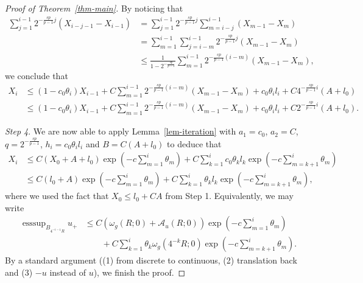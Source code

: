 \documentclass[11pt]{amsart}
\theoremstyle{plain}
\theoremstyle{definition}
\numberwithin{equation}{section}
\DeclareMathOperator*{\esssup}{esssup}
\begin{document}
\begin{proof}[Proof of Theorem~\ref{thm-main}]
    By noticing that
    \begin{equation*}
        \begin{aligned}
            \sum_{j=1}^{i-1}2^{-\frac{sp}{p-1}j}(X_{i-j-1}-X_{i-1})&=\sum_{j=1}^{i-1}2^{-\frac{sp}{p-1}j}\sum^{i-1}_{m=i-j}(X_{m-1}-X_{m})\\
            &=\sum_{m=1}^{i-1}\sum^{i-1}_{j=i-m}2^{-\frac{sp}{p-1}j}(X_{m-1}-X_{m})\\
            &\leq \frac{1}{1-2^{-\frac{sp}{p-1}}}\sum_{m=1}^{i-1}2^{-\frac{sp}{p-1}(i-m)}(X_{m-1}-X_m),
        \end{aligned}
    \end{equation*}
    we conclude that
    \begin{equation*}
        \begin{aligned}
              X_i &\leq (1-c_0\theta_i)X_{i-1}+C\sum_{m=1}^{i-1}2^{-\frac{sp}{p-1}(i-m)}(X_{m-1}-X_m)+c_0\theta_il_i+C4^{-\frac{sp}{p-1}i}(A+l_0)\\
              &\leq (1-c_0\theta_i)X_{i-1}+C\sum_{m=1}^{i-1}2^{-\frac{sp}{p-1}(i-m)}(X_{m-1}-X_m)+c_0\theta_il_i+C2^{-\frac{sp}{p-1}i}(A+l_0).
        \end{aligned}
    \end{equation*}

\emph{Step 4}. We are now able to apply Lemma~\ref{lem-iteration} with $a_1=c_0$, $a_2=C$, $q=2^{-\frac{sp}{p-1}}$, $h_i=c_0\theta_il_i$ and $B=C(A+l_0)$ to deduce that 
\begin{equation*}
    \begin{aligned}
         X_i &\leq C(X_0+A+l_0)\exp\left(-c\sum_{m=1}^{i}\theta_m\right)+C\sum_{k=1}^i c_0\theta_k l_k \exp\left(-c\sum_{m=k+1}^{i}\theta_m\right)\\
    &\leq  C(l_0+A)\exp\left(-c\sum_{m=1}^{i}\theta_m\right)+C \sum_{k=1}^i \theta_k l_k \exp\left(-c\sum_{m=k+1}^{i}\theta_m\right),
    \end{aligned}
\end{equation*}
where we used the fact that $X_0 \leq l_0+CA$ from Step 1. Equivalently, we may write
\begin{equation*}
    \begin{aligned}
        \esssup_{B_{4^{-i-1}R}}u_+ &\leq C(\omega_g(R; 0)+\mathcal{A}_u(R; 0))\exp\left(-c\sum_{m=1}^{i}\theta_m\right)\\
        &\qquad+C\sum_{k=1}^i \theta_k \omega_g(4^{-k}R; 0)\exp\left(-c\sum_{m=k+1}^{i}\theta_m\right).
    \end{aligned}
\end{equation*}
By a standard argument ((1) from discrete to continuous, (2) translation back and (3) $-u$ instead of $u$), we finish the proof.
\end{proof}
\end{document}
